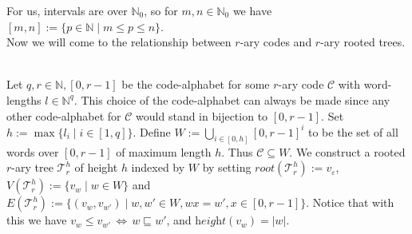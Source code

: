 \documentclass[12pt]{article}
\newcommand{\T}[0]{{\mathcal{T}_r^h}}
\newcommand{\he}[0]{\textit{height}}
\newcommand{\ro}[0]{\textit{root}}
\newenvironment{statement3}[3]{\begin{trivlist}
\item[\hskip \labelsep {\bfseries #1}\hskip \labelsep {\bfseries #2} {#3}\textbf{.}]}{\end{trivlist}}
\begin{document}
For us, intervals are over $\mathbb{N}_0$, so for $m,n \in \mathbb{N}_0$ we have $[m,n] := \{p \in \mathbb{N} \mid
m \leq p \leq n\}$.\\
Now we will come to the relationship between $r$-ary codes and $r$-ary rooted trees.

\begin{statement3}{(1.4)}{Definition}{(r-ary Trees from r-ary Codes)}\strut\\[2pt]
    Let $q,r \in \mathbb{N}, [0,r-1]$ be the code-alphabet for some $r$-ary code $\mathcal{C}$ with word-lengths
    $l \in \mathbb{N}^q$. This choice of the code-alphabet can always be made since any other code-alphabet
    for $\mathcal{C}$ would stand in bijection to $[0,r-1]$.
    Set $h := \max\{l_i \mid i \in [1,q]\}$.
    Define $W := \bigcup_{i \in [0,h]} [0,r-1]^i$ to be the set of all words over $[0,r-1]$ of maximum length $h$. Thus
    $\mathcal{C} \subseteq W$. We construct a rooted $r$-ary tree $\T$ of height $h$ indexed by $W$ by setting
    $\ro(\T) := v_\varepsilon$, $V(\T) := \{v_w \mid w \in W\}$ and
    $E(\T) := \{(v_w,v_{w'}) \mid w,w' \in W, wx = w', x\in [0,r-1]\}$. Notice that with this we have
    $v_w \leq v_{w'} \,\Longleftrightarrow\, w \sqsubseteq w'$, and $\he(v_w) = |w|$.
\end{statement3}
\end{document}
